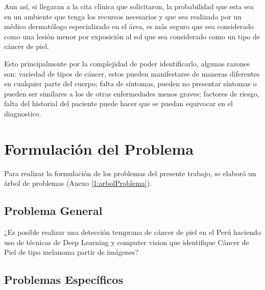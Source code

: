 Aun así, si llegaran a la cita clínica que solicitaron, la probabilidad que esta sea en un ambiente que tenga los recursos necesarios y que sea realizada por un médico dermatólogo especializado en el área, es más seguro que sea considerado como una lesión menor por exposición al sol que sea considerado como un tipo de cáncer de piel. 

Esto principalmente por la complejidad de poder identificarlo, algunas razones son: variedad de tipos de cáncer, estos pueden manifestarse de maneras diferentes en cualquier parte del cuerpo; falta de síntomas, pueden no presentar síntomas o pueden ser similares a los de otras enfermedades menos graves; factores de riesgo, falta del historial del paciente puede hacer que se puedan equivocar en el diagnostico.




\section{Formulación del Problema}

Para realizar la formulación de los problemas del presente trabajo, se elaboró un árbol de problemas (Anexo \ref{1:arbolProblema}).

\subsection{Problema General}
\newcommand{\ProblemaGeneral}{


¿Es posible realizar una detección temprana de cáncer de piel en el Perú  haciendo uso de técnicas de Deep Learning y computer vision que identifique Cáncer de Piel de tipo melanoma partir de imágenes?

}
\ProblemaGeneral
\subsection{Problemas Espec\'{i}ficos}
\newcommand{\Pbone}{
¿Cuáles son los algoritmos de Deep Learning que pueden clasificar con precisión los melanomas y no melanomas entre pacientes peruanos?
}
\newcommand{\Pbtwo}{
¿Cómo evaluar y medir la precisión de los modelos de Deep Learning en la detección de cáncer de piel de tipo melanomas y no melanomas entre pacientes peruanos? 
}
\newcommand{\Pbthree}{
¿Qué tipo de ruido pude haber en las imagenes que dificulté la clasificación de los melanomas y no melanomas entre pacientes peruanos?
}
\newcommand{\Pbfour}{
¿ Qué alternativas se proponen en los trabajos previos para seleccionar características y desarrollar el marco de trabajo de la investigación?
}
\newcommand{\Pbfive}{
¿Cuál es la influencia de las condiciones ambientales y geográficas específicas de Perú en el tratamiento del cáncer de piel?
}

